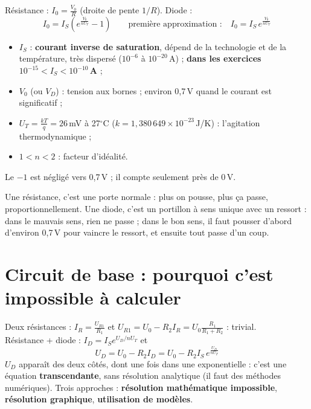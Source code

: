 \begin{thmbox}[title=Loi de la diode]
Résistance : $I_0 = \frac{V_0}{R}$ (droite de pente $1/R$). Diode :
\[ I_0 = I_S\left(e^{\frac{V_0}{nU_T}} - 1\right) \qquad
   \text{première approximation :}\quad I_0 = I_S\,e^{\frac{V_0}{nU_T}} \]
\begin{itemize}
  \item $I_S$ : \textbf{courant inverse de saturation}, dépend de la technologie et de la
        température, très dispersé ($10^{-6}$ à $10^{-20}$\,A) ; \textbf{dans les exercices
        $10^{-15} < I_S < 10^{-10}$\,A} ;
  \item $V_0$ (ou $V_D$) : tension aux bornes ; environ 0,7\,V quand le courant est
        significatif ;
  \item $U_T = \frac{kT}{q} = 26$\,mV à 27\ensuremath{^\circ}C ($k = 1{,}380\,649\times10^{-23}$\,J/K) :
        l'agitation thermodynamique ;
  \item $1 < n < 2$ : facteur d'idéalité.
\end{itemize}
Le $-1$ est négligé vers 0,7\,V ; il compte seulement près de 0\,V.
\end{thmbox}

\begin{goatbox}
Une résistance, c'est une porte normale : plus on pousse, plus ça passe, proportionnellement.
Une diode, c'est un portillon à sens unique avec un ressort : dans le mauvais sens, rien ne
passe ; dans le bon sens, il faut pousser d'abord d'environ 0,7\,V pour vaincre le ressort,
et ensuite tout passe d'un coup.
\end{goatbox}

\section{Circuit de base : pourquoi c'est impossible à calculer}


\begin{propbox}[title={Deux résistances vs résistance + diode}]
Deux résistances : $I_R = \frac{U_{R1}}{R_1}$ et
$U_{R1} = U_0 - R_2 I_R = U_0\frac{R_1}{R_1 + R_2}$ : trivial. \\
Résistance + diode : $I_D = I_S e^{U_D/nU_T}$ et
\[ U_D = U_0 - R_2 I_D = U_0 - R_2 I_S\,e^{\frac{U_D}{nU_T}} \]
$U_D$ apparaît des deux côtés, dont une fois dans une exponentielle : c'est une équation
\textbf{transcendante}, sans résolution analytique (il faut des méthodes numériques). Trois
approches : \textbf{résolution mathématique impossible}, \textbf{résolution graphique},
\textbf{utilisation de modèles}.
\end{propbox}

